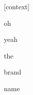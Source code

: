 \documentclass[varwidth]{standalone}
\begin{document}
\begin{CJK*}{UTF8}{gbsn}
{\setlength{\fboxsep}{0pt}\colorbox{white!0}{\parbox{0.9\textwidth}{
\colorbox{red!6.933967590332031}{\strut [context]} \colorbox{red!5.43437385559082}{\strut oh} \colorbox{red!85.9007568359375}{\strut yeah} \colorbox{red!0.3971487283706665}{\strut the} \colorbox{red!0.8961918950080872}{\strut brand} \colorbox{red!0.4375563859939575}{\strut name} 
}}}
\end{CJK*}
\end{document}
